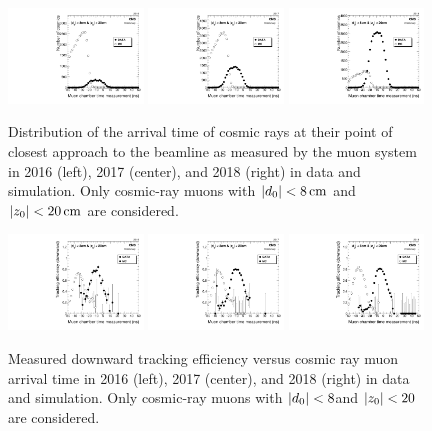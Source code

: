\begin{figure}
\centering
\includegraphics[width=0.32\textwidth]{figures/tracking_eff/2016/Muon2TimeAve.pdf}
\includegraphics[width=0.32\textwidth]{figures/tracking_eff/2017/Muon2TimeAve.pdf}
\includegraphics[width=0.32\textwidth]{figures/tracking_eff/2018/Muon2TimeAve.pdf}
\caption{Distribution of the arrival time of cosmic rays at their point of closest approach to the beamline as measured by the muon system in 2016 (left), 2017 (center), and 2018 (right) in data and simulation. Only cosmic-ray muons with $\ad<\SI{8}{\cm}$ and $\az<\SI{20}{\cm}$ are considered.}
\label{arrival_time}
\end{figure}

\begin{figure}[hbtp]
\centering
\includegraphics[width=0.32\textwidth]{figures/tracking_eff/2016/Eff0vsMuon2Time.pdf}
\includegraphics[width=0.32\textwidth]{figures/tracking_eff/2017/Eff0vsMuon2Time.pdf}
\includegraphics[width=0.32\textwidth]{figures/tracking_eff/2018/Eff0vsMuon2Time.pdf}
\caption{Measured downward tracking efficiency versus cosmic ray muon arrival time in 2016 (left), 2017 (center), and 2018 (right) in data and simulation. Only cosmic-ray muons with $\lvert d_0 \rvert<8$\cm and $\lvert z_0 \rvert<20$\cm are considered.}
\label{trk_eff_vs_arrival_time}
\end{figure}